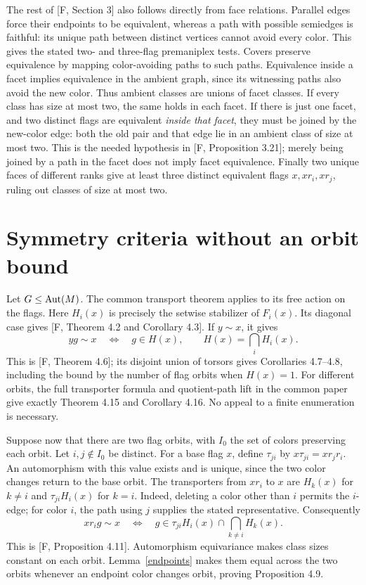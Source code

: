\documentclass[a4paper,11pt]{article}
\begin{document}
The rest of [F, Section 3] also follows directly from face relations.
Parallel edges force their endpoints to be equivalent, whereas a path
with possible semiedges is faithful: its unique path between distinct
vertices cannot avoid every color. This gives the stated two- and
three-flag premaniplex tests. Covers preserve equivalence by mapping
color-avoiding paths to such paths. Equivalence inside a facet implies
equivalence in the ambient graph, since its witnessing paths also avoid
the new color. Thus ambient classes are unions of facet classes.
If every class has size at most two, the same holds in each facet.
If there is just one facet, and two distinct flags are equivalent
\emph{inside that facet}, they must be joined by the new-color edge:
both the old pair and that edge lie in an ambient class of size at most
two. This is the needed hypothesis in [F, Proposition 3.21]; merely
being joined by a path in the facet does not imply facet equivalence.
Finally two unique faces of different ranks give at least three distinct
equivalent flags $x,xr_i,xr_j$, ruling out classes of size at most two.

\section{Symmetry criteria without an orbit bound}
Let $G\leq\operatorname{Aut}(M)$. The common transport theorem applies to its free
action on the flags. Here $H_i(x)$ is precisely the setwise stabilizer
of $F_i(x)$. Its diagonal case gives [F, Theorem 4.2 and Corollary 4.3].
If $y\sim x$, it gives
\[
 yg\sim x\quad\Longleftrightarrow\quad g\in H(x),
 \qquad H(x)=\bigcap_iH_i(x).
\]
This is [F, Theorem 4.6]; its disjoint union of torsors gives
Corollaries 4.7--4.8, including the bound by the number of flag orbits
when $H(x)=1$. For different orbits, the full transporter formula and
quotient-path lift in the common paper give exactly Theorem 4.15 and
Corollary 4.16. No appeal to a finite enumeration is necessary.

Suppose now that there are two flag orbits, with $I_0$ the set of
colors preserving each orbit. Let $i,j\notin I_0$ be distinct.
For a base flag $x$, define $\tau_{ji}$ by
$x\tau_{ji}=xr_jr_i$. An automorphism with this value exists and
is unique, since the two color changes return to the base orbit.
The transporters from $xr_i$ to $x$ are $H_k(x)$ for $k\ne i$
and $\tau_{ji}H_i(x)$ for $k=i$. Indeed, deleting a color other
than $i$ permits the $i$-edge; for color $i$, the path using $j$
supplies the stated representative. Consequently
\[
 xr_i g\sim x\quad\Longleftrightarrow\quad
 g\in\tau_{ji}H_i(x)\cap\bigcap_{k\ne i}H_k(x).
 \tag{1}
\]
This is [F, Proposition 4.11]. Automorphism equivariance makes class
sizes constant on each orbit. Lemma~\ref{endpoints} makes them equal
across the two orbits whenever an endpoint color changes orbit,
proving Proposition 4.9.
\end{document}

